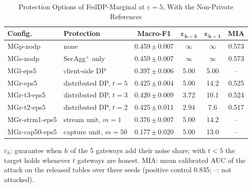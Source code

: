 \documentclass[conference]{IEEEtran}
\begin{document}
\begin{table}[!t]
\centering
\caption{Protection Options of FedDP-Marginal at $\varepsilon = 5$, With the Non-Private References}
\label{tab:protection}
\scriptsize
\setlength{\tabcolsep}{2.8pt}
\begin{tabular}{l l c c c c}
\toprule
\textbf{Config.} & \textbf{Protection} & \textbf{Macro-F1} & $\boldsymbol{\varepsilon_{h=5}}$ & $\boldsymbol{\varepsilon_{h=1}}$ & \textbf{MIA} \\
\midrule
MGp-nodp       & none                     & 0.459\,$\pm$\,0.007 & $\infty$ & $\infty$ & 0.573 \\
MGs-nodp       & SecAgg$^+$ only          & 0.459\,$\pm$\,0.007 & $\infty$ & $\infty$ & 0.573 \\
MGl-eps5       & client-side DP           & 0.397\,$\pm$\,0.006 & 5.00 & 5.00 & -- \\
MGr-eps5       & distributed DP, $t = 5$  & 0.425\,$\pm$\,0.004 & 5.00 & 14.2 & 0.525 \\
MGr-t3-eps5    & distributed DP, $t = 3$  & 0.420\,$\pm$\,0.009 & 3.72 & 10.1 & 0.524 \\
MGr-t2-eps5    & distributed DP, $t = 2$  & 0.425\,$\pm$\,0.011 & 2.94 & 7.6  & 0.517 \\
MGr-strm1-eps5 & stream unit, $m = 1$     & 0.376\,$\pm$\,0.007 & 5.00 & 14.2 & -- \\
MGr-cap50-eps5 & capture unit, $m = 50$   & 0.177\,$\pm$\,0.020 & 5.00 & 13.0 & -- \\
\bottomrule
\end{tabular}

\vspace{2pt}
\parbox{\columnwidth}{\scriptsize $\varepsilon_{h}$: guarantee when $h$ of the 5 gateways add their noise share; with $t < 5$ the target holds whenever $t$ gateways are honest. MIA: mean calibrated AUC of the attack on the released tables over three seeds (positive control 0.835; --: not attacked).}
\end{table}
\end{document}
